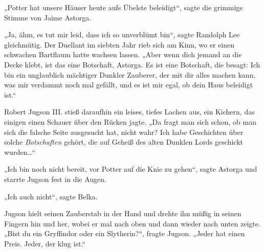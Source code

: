 „Potter hat unsere Häuser heute aufs Übelste beleidigt“, sagte die grimmige Stimme von Jaime Astorga.

„Ja, ähm, es tut mir leid, dass ich so unverblümt bin“, sagte Randolph Lee gleichmütig. Der Duellant im siebten Jahr rieb sich am Kinn, wo er einen schwachen Bartflaum hatte wachsen lassen. „Aber wenn dich jemand an die Decke klebt, ist das eine Botschaft, Astorga. Es ist eine Botschaft, die besagt: Ich bin ein unglaublich mächtiger Dunkler Zauberer, der mit dir alles machen kann, was mir verdammt noch mal gefällt, und es ist mir egal, ob dein Haus beleidigt ist.“

Robert Jugson III. stieß daraufhin ein leises, tiefes Lachen aus, ein Kichern, das einigen einen Schauer über den Rücken jagte. „Da fragt man sich schon, ob man sich die falsche Seite ausgesucht hat, nicht wahr? Ich habe Geschichten über solche \emph{Botschaften} gehört, die auf Geheiß des alten Dunklen Lords geschickt wurden…“

„Ich bin noch nicht bereit, vor Potter auf die Knie zu gehen“, sagte Astorga und starrte Jugson fest in die Augen.

„Ich auch nicht“, sagte Belka.

Jugson hielt seinen Zauberstab in der Hand und drehte ihn müßig in seinen Fingern hin und her, wobei er mal nach oben und dann wieder nach unten zeigte. „Bist du ein Gryffindor oder ein Slytherin?“, fragte Jugson. „Jeder hat einen Preis. Jeder, der klug ist.“

